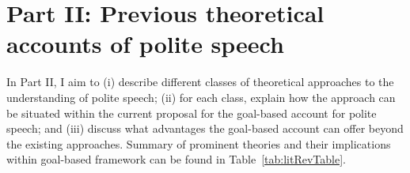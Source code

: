 \documentclass[oneside]{report}
\begin{document}
\section{Part II: Previous theoretical accounts of polite
speech}\label{part-ii-previous-theoretical-accounts-of-polite-speech}

In Part II, I aim to (i) describe different classes of theoretical
approaches to the understanding of polite speech; (ii) for each class,
explain how the approach can be situated within the current proposal for
the goal-based account for polite speech; and (iii) discuss what
advantages the goal-based account can offer beyond the existing
approaches. Summary of prominent theories and their implications within
goal-based framework can be found in Table~\ref{tab:litRevTable}.

\newpage
\end{document}
